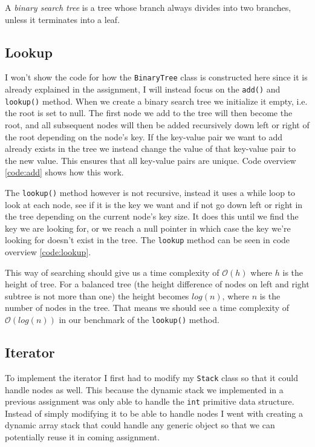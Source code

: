 \documentclass[a4paper,11pt]{article}
\begin{document}
A \textit{binary search tree} is a tree whose branch always divides into two branches, unless it terminates
into a leaf.
\subsection{Lookup}

I won't show the code for how the {\tt BinaryTree} class is constructed here since it
is already explained in the assignment, I will instead focus on the {\tt add()} and
    {\tt lookup()} method. When we create a binary search tree we initialize it empty, i.e. the
root is set to null. The first node we add to the tree will then become the root, and
all subsequent nodes will then be added recursively down left or right of the root
depending on the node's key. If the key-value pair we want to add already exists in the
tree we instead change the value of that key-value pair to the new value. This ensures
that all key-value pairs are unique. Code overview \ref{code:add} shows how this work.

The {\tt lookup()} method however is not recursive, instead it uses a while loop to look
at each node, see if it is the key we want and if not go down left or right in the tree
depending on the current node's key size. It does this until we find the key we are looking
for, or we reach a null pointer in which case the key we're looking for doesn't exist in
the tree. The {\tt lookup} method can be seen in code overview \ref{code:lookup}.

This way of searching should give us a time complexity of $\mathcal{O}(h)$ where
$h$ is the height of tree. For a balanced tree (the height difference of nodes on
left and right subtree is not more than one) the height becomes $log(n)$, where $n$ is
the number of nodes in the tree. That means we should see a time complexity of
$\mathcal{O}(log(n))$ in our benchmark of the {\tt lookup()} method.

\subsection{Iterator}
To implement the iterator I first had to modify my {\tt Stack} class so that it could
handle nodes as well. This because the dynamic stack we implemented in a previous assignment
was only able to handle the {\tt int} primitive data structure. Instead of simply modifying
it to be able to handle nodes I went with creating a dynamic array stack that could handle
any generic object so that we can potentially reuse it in coming assignment.
\end{document}
